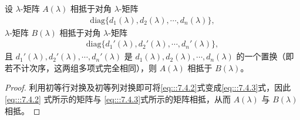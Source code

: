 \documentclass[../../main.tex]{subfiles}%
\begin{document}
\begin{lemma}\label{lemma:对角元素的置换不改变相抵性}
设 $\lambda$-矩阵 $A(\lambda)$ 相抵于对角 $\lambda$-矩阵
\begin{align}
\mathrm{diag}\{d_1(\lambda),d_2(\lambda),\cdots,d_n(\lambda)\},
\label{eq:::7.4.2}
\end{align}
$\lambda$-矩阵 $B(\lambda)$ 相抵于对角 $\lambda$-矩阵
\begin{align}
\mathrm{diag}\{d_1'(\lambda),d_2'(\lambda),\cdots,d_n'(\lambda)\},
\label{eq:::7.4.3}
\end{align}
且 $d_1'(\lambda),d_2'(\lambda),\cdots,d_n'(\lambda)$ 是 $d_1(\lambda),d_2(\lambda),\cdots,d_n(\lambda)$ 的一个置换（即若不计次序，这两组多项式完全相同），则 $A(\lambda)$ 相抵于 $B(\lambda)$。
\end{lemma}
\begin{proof}
利用初等行对换及初等列对换即可将\eqref{eq:::7.4.2}式变成\eqref{eq:::7.4.3}式，因此\eqref{eq:::7.4.2} 式所示的矩阵与 \eqref{eq:::7.4.3}式所示的矩阵相抵，从而 $A(\lambda)$ 与 $B(\lambda)$ 相抵。
\end{proof}
\end{document}
